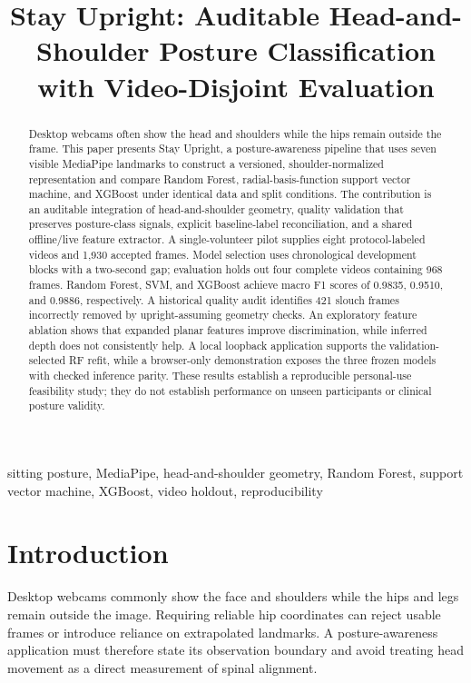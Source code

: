 \documentclass[conference]{IEEEtran}
\title{Stay Upright: Auditable Head-and-Shoulder Posture Classification with Video-Disjoint Evaluation}
\author{\IEEEauthorblockN{Snehal Dixit}
\IEEEauthorblockA{School of Computing Science Engineering and Artificial Intelligence (SCAI)\\
VIT Bhopal University, India\\
snehal.25mip10072@vitbhopal.ac.in}}
\begin{document}
\maketitle
\begin{abstract}
Desktop webcams often show the head and shoulders while the hips remain outside the frame. This paper presents Stay Upright, a posture-awareness pipeline that uses seven visible MediaPipe landmarks to construct a versioned, shoulder-normalized representation and compare Random Forest, radial-basis-function support vector machine, and XGBoost under identical data and split conditions. The contribution is an auditable integration of head-and-shoulder geometry, quality validation that preserves posture-class signals, explicit baseline-label reconciliation, and a shared offline/live feature extractor. A single-volunteer pilot supplies eight protocol-labeled videos and 1,930 accepted frames. Model selection uses chronological development blocks with a two-second gap; evaluation holds out four complete videos containing 968 frames. Random Forest, SVM, and XGBoost achieve macro F1 scores of 0.9835, 0.9510, and 0.9886, respectively. A historical quality audit identifies 421 slouch frames incorrectly removed by upright-assuming geometry checks. An exploratory feature ablation shows that expanded planar features improve discrimination, while inferred depth does not consistently help. A local loopback application supports the validation-selected RF refit, while a browser-only demonstration exposes the three frozen models with checked inference parity. These results establish a reproducible personal-use feasibility study; they do not establish performance on unseen participants or clinical posture validity.
\end{abstract}
\begin{IEEEkeywords}
sitting posture, MediaPipe, head-and-shoulder geometry, Random Forest, support vector machine, XGBoost, video holdout, reproducibility
\end{IEEEkeywords}

\section{Introduction}
Desktop webcams commonly show the face and shoulders while the hips and legs remain outside the image. Requiring reliable hip coordinates can reject usable frames or introduce reliance on extrapolated landmarks. A posture-awareness application must therefore state its observation boundary and avoid treating head movement as a direct measurement of spinal alignment.
\end{document}
